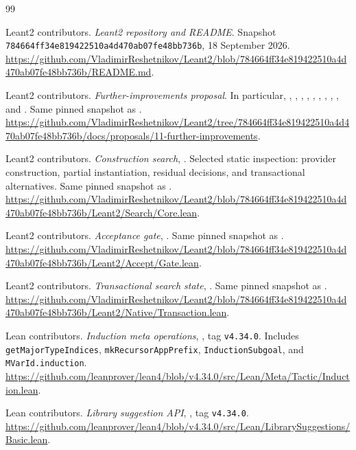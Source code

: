 \documentclass[11pt,a4paper]{article}
\theoremstyle{definition}
\theoremstyle{remark}
\newcommand{\code}[1]{\texttt{#1}}
\begin{document}
\begin{thebibliography}{99}
\small
\setlength{\itemsep}{0.65em}
\raggedright

Leant2 contributors. \emph{Leant2 repository and README}. Snapshot
\code{784664ff34e819422510a4d470ab07fe48bb736b}, 18 September 2026.
\url{https://github.com/VladimirReshetnikov/Leant2/blob/784664ff34e819422510a4d470ab07fe48bb736b/README.md}.

Leant2 contributors. \emph{Further-improvements proposal}. In particular,
, , ,
, , ,
, , , and
. Same pinned snapshot as \cite{repo}.
\url{https://github.com/VladimirReshetnikov/Leant2/tree/784664ff34e819422510a4d470ab07fe48bb736b/docs/proposals/11-further-improvements}.

Leant2 contributors. \emph{Construction search},
. Selected static inspection: provider
construction, partial instantiation, residual decisions, and transactional
alternatives. Same pinned snapshot as \cite{repo}.
\url{https://github.com/VladimirReshetnikov/Leant2/blob/784664ff34e819422510a4d470ab07fe48bb736b/Leant2/Search/Core.lean}.

Leant2 contributors. \emph{Acceptance gate},
. Same pinned snapshot as \cite{repo}.
\url{https://github.com/VladimirReshetnikov/Leant2/blob/784664ff34e819422510a4d470ab07fe48bb736b/Leant2/Accept/Gate.lean}.

Leant2 contributors. \emph{Transactional search state},
. Same pinned snapshot as \cite{repo}.
\url{https://github.com/VladimirReshetnikov/Leant2/blob/784664ff34e819422510a4d470ab07fe48bb736b/Leant2/Native/Transaction.lean}.

Lean contributors. \emph{Induction meta operations},
, tag \code{v4.34.0}.
Includes \code{getMajorTypeIndices}, \code{mkRecursorAppPrefix},
\code{InductionSubgoal}, and \code{MVarId.induction}.
\url{https://github.com/leanprover/lean4/blob/v4.34.0/src/Lean/Meta/Tactic/Induction.lean}.

Lean contributors. \emph{Library suggestion API},
, tag \code{v4.34.0}.
\url{https://github.com/leanprover/lean4/blob/v4.34.0/src/Lean/LibrarySuggestions/Basic.lean}.


\end{thebibliography}
\end{document}
